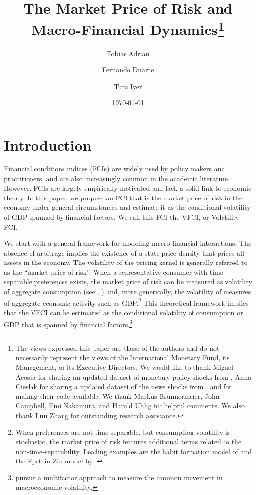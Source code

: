 \documentclass[12pt]{article}
\title{\textbf{The Market Price of Risk and \\ Macro-Financial Dynamics}\thanks{The views expressed  this paper are those of the authors and do not necessarily represent the views of the International Monetary Fund, its Management, or its Executive Directors. We would like to thank Miguel Acosta for sharing an updated dataset of monetary policy shocks from \cite{ns_shock}, Anna Cieslak for sharing a updated dataset of the news shocks from \cite{cp_shock}, and \cite{bpss} for making their code available. We thank Markus Brunnermeier, John Campbell, Emi Nakamura, and Harald Uhlig for helpful comments. We also thank Luu Zhang for outstanding research assistance.} \\ }
\author[1]{Tobias Adrian}
\author[2]{Fernando Duarte}
\author[1]{Tara Iyer}
\affil[1]{International Monetary Fund}
\affil[2]{Brown University}
\date{\today}
\begin{document}
\setcounter{page}{0}
\maketitle

\thispagestyle{empty}


\section{Introduction}

Financial conditions indices (FCIs) are widely used by policy makers and practitioners, and are also increasingly common in the academic literature. However, FCIs are largely empirically motivated and lack a solid link to economic theory. In this paper, we propose an FCI that is the market price of risk in the economy under general circumstances and estimate it as the conditional volatility of GDP spanned by financial factors. We call this FCI the VFCI, or Volatility-FCI. 

We start with a general framework for modeling macro-financial interactions. The absence of arbitrage implies the existence of a state price density that prices all assets in the economy. The volatility of the pricing kernel is generally referred to as the ``market price of risk''. When a representative consumer with time separable preferences exists, the market price of risk can be measured as volatility of aggregate consumption (see \textcite{breeden1979}, \cite{DuffieZame89}) and, more generically, the volatility of measures of aggregate economic activity such as GDP.\footnote{When preferences are not time separable, but consumption volatility is stochastic, the market price of risk features additional terms related to the non-time-separability. Leading examples are the habit formation model of \cite{campbell1999force} and the Epstein-Zin model by \cite{bansal2004risks}.} This theoretical framework implies that the VFCI can be estimated as the conditional volatility of consumption or GDP that is spanned by financial factors.\footnote{\cite{jurado2015measuring} pursue a multifactor approach to measure the common movement in macroeconomic volatility.}

\begin{singlespace}
\printbibliography 
\end{singlespace}
\end{document}
